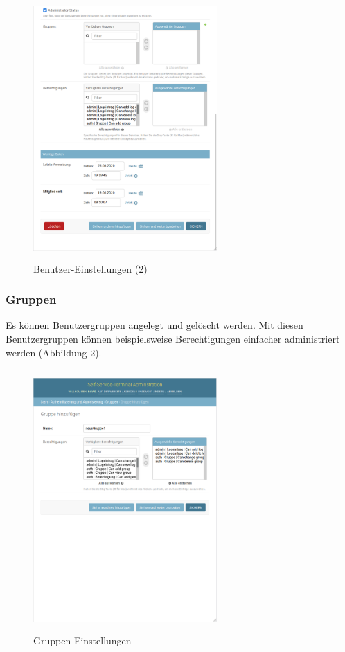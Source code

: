 \begin{figure}[htp]
    \centering
    \includegraphics[width=7cm , height=10cm]{Bilder/AdminBenutzer2.png}
    \caption[Startseite des Self-Service-Terminals]{Benutzer-Einstellungen (2)}
    \label{fig:SSTBenutzer2}
\end{figure}

\newpage

\subsubsection{Gruppen} Es können Benutzergruppen angelegt und gelöscht werden. Mit diesen Benutzergruppen können beispielsweise Berechtigungen einfacher administriert werden (Abbildung 2).

\begin{figure}[htp]
    \centering
    \includegraphics[width=7cm , height=10cm]{Bilder/AdminGruppe.png}
    \caption[Startseite des Self-Service-Terminals]{Gruppen-Einstellungen}
    \label{fig:SSTGruppe}
\end{figure}

